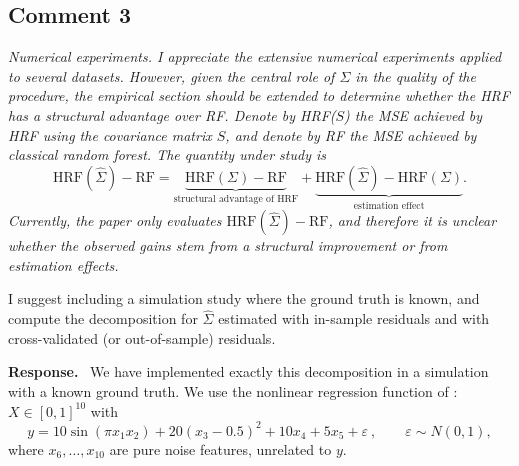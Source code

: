 \documentclass[12pt]{article}
\newcommand{\comment}[1]{\begin{refbox}\itshape #1\end{refbox}}
\newcommand{\response}{\medskip\noindent\textbf{Response.}\ }
\begin{document}
\newpage
\subsection*{Comment 3}

\comment{Numerical experiments. I appreciate the extensive numerical
experiments applied to several datasets. However, given the central role of
$\Sigma$ in the quality of the procedure, the empirical section should be
extended to determine whether the HRF has a structural advantage over RF.
Denote by HRF($S$) the MSE achieved by HRF using the covariance matrix $S$,
and denote by RF the MSE achieved by classical random forest. The quantity
under study is
$$
\text{HRF}(\hat\Sigma) - \text{RF} =
\underbrace{\text{HRF}(\Sigma) - \text{RF}}_{\text{structural advantage of HRF}}
+ \underbrace{\text{HRF}(\hat\Sigma) - \text{HRF}(\Sigma)}_{\text{estimation effect}}.
$$
Currently, the paper only evaluates $\text{HRF}(\hat\Sigma) - \text{RF}$, and
therefore it is unclear whether the observed gains stem from a structural
improvement or from estimation effects.

I suggest including a simulation study where the ground truth is known, and
compute the decomposition for $\hat\Sigma$ estimated with in-sample residuals
and with cross-validated (or out-of-sample) residuals.}

\response
We have implemented exactly this decomposition in a simulation with a known
ground truth. We use the nonlinear regression function of
\citet{friedman:1991}: $X \in [0,1]^{10}$ with
$$
y = 10 \sin(\pi x_1 x_2) + 20 (x_3 - 0.5)^2 + 10 x_4 + 5 x_5 + \varepsilon~,
\qquad \varepsilon \sim N(0,1),
$$
where $x_6, \ldots, x_{10}$ are pure noise features, unrelated to $y$.
\end{document}
